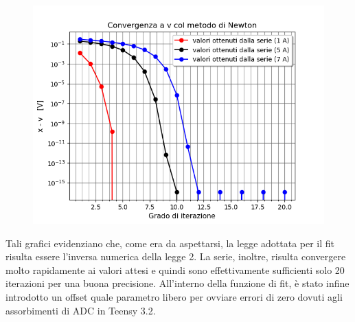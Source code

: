 \documentclass{article}[a4paper, oneside, 11pt]
\begin{document}
\begin{figure}[H]
	\centering 
 		\includegraphics[scale=0.75]{./Figura3_appendiceB.png}
\end{figure}

Tali grafici evidenziano che, come era da aspettarsi, la legge adottata per il fit risulta essere l’inversa numerica della legge 2. La serie, inoltre, risulta convergere molto rapidamente ai valori attesi e quindi sono effettivamente sufficienti solo 20 iterazioni per una buona precisione.
All’interno della funzione di fit, è stato infine introdotto un offset quale parametro libero per ovviare errori di zero dovuti agli assorbimenti di ADC in Teensy 3.2.

\medskip


\end{document}
